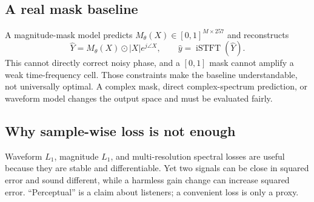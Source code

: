 \documentclass[11pt,letterpaper]{article}
\newcommand{\R}{\mathbb{R}}
\begin{document}
\begin{center}
\end{center}

\subsection{A real mask baseline}
A magnitude-mask model predicts $M_\theta(X)\in[0,1]^{M\times257}$ and reconstructs
\begin{equation}
\widehat Y=M_\theta(X)\odot |X|e^{j\angle X},\qquad \hat y=\operatorname{iSTFT}(\widehat Y).
\end{equation}
This cannot directly correct noisy phase, and a $[0,1]$ mask cannot amplify a weak time-frequency cell. Those constraints make the baseline understandable, not universally optimal. A complex mask, direct complex-spectrum prediction, or waveform model changes the output space and must be evaluated fairly.

\subsection{Why sample-wise loss is not enough}
Waveform $L_1$, magnitude $L_1$, and multi-resolution spectral losses are useful because they are stable and differentiable. Yet two signals can be close in squared error and sound different, while a harmless gain change can increase squared error. ``Perceptual'' is a claim about listeners; a convenient loss is only a proxy.
\end{document}

